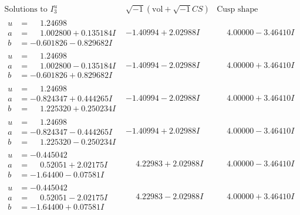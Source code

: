 \documentclass[1p]{elsarticle_modified}
\theoremstyle{definition}
\newcommand{\I}{\sqrt{-1}}
\begin{document}
$$\begin{array}{c|c|c}  
\text{Solutions to }I^u_{3}& \I (\text{vol} + \sqrt{-1}CS) & \text{Cusp shape}\\
 \hline 
\begin{aligned}
u &= \phantom{-}1.24698\phantom{ +0.000000I} \\
a &= \phantom{-}1.002800 + 0.135184 I \\
b &= -0.601826 - 0.829682 I\end{aligned}
 & -1.40994 + 2.02988 I & \phantom{-}4.00000 - 3.46410 I \\ \hline\begin{aligned}
u &= \phantom{-}1.24698\phantom{ +0.000000I} \\
a &= \phantom{-}1.002800 - 0.135184 I \\
b &= -0.601826 + 0.829682 I\end{aligned}
 & -1.40994 - 2.02988 I & \phantom{-}4.00000 + 3.46410 I \\ \hline\begin{aligned}
u &= \phantom{-}1.24698\phantom{ +0.000000I} \\
a &= -0.824347 + 0.444265 I \\
b &= \phantom{-}1.225320 + 0.250234 I\end{aligned}
 & -1.40994 - 2.02988 I & \phantom{-}4.00000 + 3.46410 I \\ \hline\begin{aligned}
u &= \phantom{-}1.24698\phantom{ +0.000000I} \\
a &= -0.824347 - 0.444265 I \\
b &= \phantom{-}1.225320 - 0.250234 I\end{aligned}
 & -1.40994 + 2.02988 I & \phantom{-}4.00000 - 3.46410 I \\ \hline\begin{aligned}
u &= -0.445042\phantom{ +0.000000I} \\
a &= \phantom{-}0.52051 + 2.02175 I \\
b &= -1.64400 - 0.07581 I\end{aligned}
 & \phantom{-}4.22983 + 2.02988 I & \phantom{-}4.00000 - 3.46410 I \\ \hline\begin{aligned}
u &= -0.445042\phantom{ +0.000000I} \\
a &= \phantom{-}0.52051 - 2.02175 I \\
b &= -1.64400 + 0.07581 I\end{aligned}
 & \phantom{-}4.22983 - 2.02988 I & \phantom{-}4.00000 + 3.46410 I \\ \hline\begin{aligned}

\end{aligned}
\end{array}$$
\end{document}
